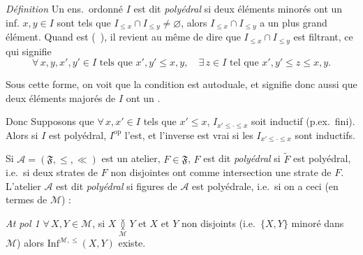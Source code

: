 \documentclass[11pt,a4paper]{article}
\begin{document}
\emph{Définition} \quad Un ens.\ ordonné $I$ est dit \emph{polyédral} si deux éléments minorés ont un inf.   $x, y \in I$ sont tels que $I_{\leq x} \cap I_{\leq y} \neq \varnothing$, alors $I_{\leq x} \cap I_{\leq y}$ a un plus grand élément. Quand \struck{\ill{}} \add{\ill{}} est  (\ ), il revient au même de dire que \struck{\ill{}} $I_{\leq x} \cap I_{\leq y}$ est filtrant, \struck{\ill{}} ce qui signifie
\[
  \forall\, x, y, x', y' \in I \text{ tels que } x', y' \leq x, y ,\quad \exists\, z \in I \text{ tel que } x', y' \leq z \leq x, y .
\]

Sous cette forme, on voit que la condition est autoduale, et signifie donc aussi que deux éléments majorés de $I$ ont un .


Donc \emph{\ill{}} Supposons que $\forall\, x, x' \in I$ tels que $x' \leq x$, $I_{x' \leq \cdot \leq x}$ soit inductif  (p.ex.\ fini). Alors si $I$ est polyédral, $I^{\mathrm{op}}$ l'est, et l'inverse est vrai si les $I_{x' \leq \cdot \leq x}$ sont inductifs.

Si $\mathcal{A} = (\mathfrak{F}, \leq, \ll)$ est un atelier, $F \in \mathfrak{F}$,  $F$ est dit \emph{polyédral} si $\widetilde{F}$ est polyédral, i.e.\ si deux strates de $F$ non disjointes ont comme intersection une strate de $F$. L'atelier $\mathcal{A}$ est dit \emph{polyédral} si   figures de $\mathcal{A}$ est polyédrale, i.e.\ si on a ceci (en termes de $\mathcal{M}$) :

\emph{At pol 1} \quad $\forall\, X, Y \in \mathcal{M}$, si $X \underset{\mathcal{M}}{\between} Y$ et $X$ et $Y$ non disjoints (i.e.\ $\lbrace X, Y \rbrace$ minoré dans $\mathcal{M}$) alors \struck{\ill{}} $\mathrm{Inf}^{\mathcal{M}, \leq}(X, Y)$ existe.

\end{document}
